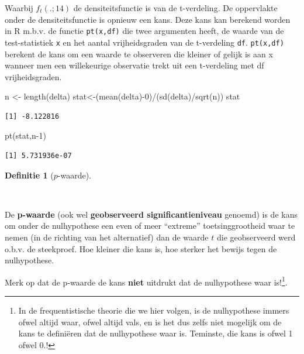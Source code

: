 \documentclass[
  dutch,
  letterpaper,
  12pt]{book}
\newenvironment{Shaded}{\begin{snugshade}}{\end{snugshade}}
\newcommand{\DecValTok}[1]{\textcolor[rgb]{0.68,0.00,0.00}{#1}}
\newcommand{\FunctionTok}[1]{\textcolor[rgb]{0.28,0.35,0.67}{#1}}
\newcommand{\NormalTok}[1]{\textcolor[rgb]{0.00,0.23,0.31}{#1}}
\newcommand{\OtherTok}[1]{\textcolor[rgb]{0.00,0.23,0.31}{#1}}
\newcommand{\SpecialCharTok}[1]{\textcolor[rgb]{0.37,0.37,0.37}{#1}}
\theoremstyle{definition}
\theoremstyle{definition}
\newtheorem{definition}{Definitie}[chapter]
\theoremstyle{definition}
\theoremstyle{remark}
\begin{document}
Waarbij \(f_t(.;14)\) de densiteitsfunctie is van de t-verdeling. De
oppervlakte onder de densiteitsfunctie is opnieuw een kans. Deze kans
kan berekend worden in R m.b.v. de functie \texttt{pt(x,df)} die twee
argumenten heeft, de waarde van de test-statistiek \texttt{x} en het
aantal vrijheidsgraden van de t-verdeling \texttt{df}. \texttt{pt(x,df)}
berekent de kans om een waarde te observeren die kleiner of gelijk is
aan x wanneer men een willekeurige observatie trekt uit een t-verdeling
met df vrijheidsgraden.

\begin{Shaded}
\begin{Highlighting}[]
\NormalTok{n }\OtherTok{\textless{}{-}} \FunctionTok{length}\NormalTok{(delta)}
\NormalTok{stat}\OtherTok{\textless{}{-}}\NormalTok{(}\FunctionTok{mean}\NormalTok{(delta)}\SpecialCharTok{{-}}\DecValTok{0}\NormalTok{)}\SpecialCharTok{/}\NormalTok{(}\FunctionTok{sd}\NormalTok{(delta)}\SpecialCharTok{/}\FunctionTok{sqrt}\NormalTok{(n))}
\NormalTok{stat}
\end{Highlighting}
\end{Shaded}

\begin{verbatim}
[1] -8.122816
\end{verbatim}

\begin{Shaded}
\begin{Highlighting}[]
\FunctionTok{pt}\NormalTok{(stat,n}\DecValTok{{-}1}\NormalTok{)}
\end{Highlighting}
\end{Shaded}

\begin{verbatim}
[1] 5.731936e-07
\end{verbatim}

\begin{definition}[\(p\)-waarde]\protect\hypertarget{def-p-waarde}{}\label{def-p-waarde}

~

\end{definition}

De \textbf{p-waarde} (ook wel \textbf{geobserveerd significantieniveau}
genoemd) is de kans om onder de nulhypothese een even of meer
``extreme'' toetsinggrootheid waar te nemen (in de richting van het
alternatief) dan de waarde \(t\) die geobserveerd werd o.b.v. de
steekproef. Hoe kleiner die kans is, hoe sterker het bewijs tegen de
nulhypothese.

Merk op dat de p-waarde de kans \textbf{niet} uitdrukt dat de
nulhypothese waar is!\footnote{In de frequentistische theorie die we
  hier volgen, is de nulhypothese immers ofwel altijd waar, ofwel altijd
  vals, en is het dus zelfs niet mogelijk om de kans te definiëren dat
  de nulhypothese waar is. Teminste, die kans is ofwel 1 ofwel 0.!}.
\end{document}
